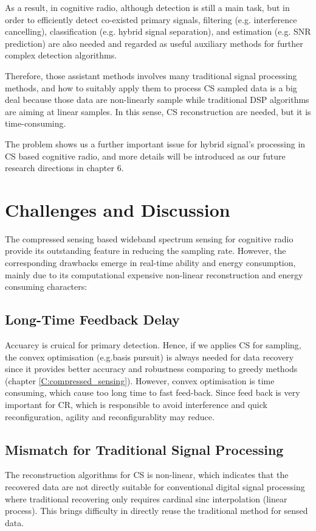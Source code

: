 As a result, in cognitive radio, although detection is still a main task, but 
in order to efficiently detect co-existed primary signals, filtering (e.g. interference cancelling),  classification (e.g. hybrid signal separation), and estimation (e.g. SNR prediction) are also needed and regarded as useful auxiliary methods for further complex detection algorithms. 

Therefore, those assistant methods involves many traditional signal processing methods, and how to suitably apply them to process CS sampled data is a big deal because those data are non-linearly sample while traditional DSP algorithms are aiming at linear samples. In this sense, CS reconstruction are
needed, but it is time-consuming.

The problem shows us a further important issue for hybrid signal's processing in CS based cognitive radio, and more details will be introduced as our future research directions in chapter 6. 

\section{Challenges and Discussion}

The compressed sensing based wideband spectrum sensing for cognitive radio provide its outstanding feature in reducing the sampling rate. However, the corresponding drawbacks emerge in real-time ability and energy consumption, mainly due to its computational expensive non-linear reconstruction and energy consuming characters: 

\subsection{Long-Time Feedback Delay}
Accuarcy is cruical for primary detection. Hence, if we applies CS for sampling, the convex optimisation (e.g.basis pursuit) is always needed for data recovery since it provides better accuracy and robustness comparing to greedy methods (chapter \ref{C:compressed_sensing}). However, convex optimisation is time consuming, which cause too long time to fast feed-back. Since feed back is very important for CR, which is responsible to avoid interference and quick reconfiguration, agility and reconfigurablity may reduce.

\subsection{Mismatch for Traditional Signal Processing}
The reconstruction algorithms for CS is non-linear, which indicates that the recovered data are not directly suitable for conventional digital signal processing where traditional recovering only requires cardinal sinc interpolation (linear process). This brings difficulty in directly reuse the traditional method for sensed data.

